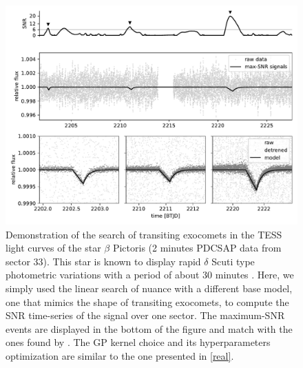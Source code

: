 \documentclass[modern]{aastex631}
\newcommand{\nuancecode}{\textsf{nuance}}
\begin{document}
\begin{figure}[H]
    \begin{centering}
        \includegraphics[width=\linewidth]{exocomet.pdf}
        \caption{Demonstration of the search of transiting exocomets in the TESS light curves of the star $\beta$ Pictoris (2 minutes PDCSAP data from sector 33). This star is known to display rapid $\delta$ Scuti type photometric variations with a period of about 30 minutes \citep{Lecavelier2022}. Here, we simply used the linear search of \nuancecode{} with a different base model, one that mimics the shape of transiting exocomets, to compute the SNR time-series of the signal over one sector. The maximum-SNR events are displayed in the bottom of the figure and match with the ones found by \cite{Lecavelier2022}. The GP kernel choice and its hyperparameters optimization are similar to the one presented in \autoref{real}.}
        \end{centering}
        \label{fig:exocomets} 
\end{figure}
\end{document}
